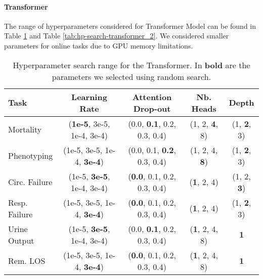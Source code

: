 \documentclass{article}
\begin{document}
\paragraph{Transformer} The range of hyperparameters considered for Transformer Model can be found in Table \ref{tab:hp-search-transformer} and Table \ref{tab:hp-search-transformer_2}. We considered smaller parameters for online tasks due to GPU memory limitations.
\begin{table}[tbh!]
    \centering
    \footnotesize
\begin{tabular}{l|c|c|c|c}

\toprule
Task & Learning Rate &  Attention Drop-out  & Nb. Heads & Depth  \\
\midrule
\midrule

Mortality & (\textbf{1e-5}, 3e-5, 1e-4, 3e-4) &  (0.0, \textbf{0.1}, 0.2, 0.3, 0.4) &    (1, 2, \textbf{4}, 8) &   (1, \textbf{2}, 3)  \\
Phenotyping & (1e-5, 3e-5, 1e-4, \textbf{3e-4}) &  (0.0, 0.1, \textbf{0.2}, 0.3, 0.4) &   (1, 2, 4, \textbf{8}) &  (1, \textbf{2}, 3) \\
\midrule
\midrule

Circ. Failure & (1e-5, \textbf{3e-5}, 1e-4, 3e-4) &  (\textbf{0.0}, 0.1, 0.2, 0.3, 0.4) & (\textbf{1}, 2, 4) & (1, 2, \textbf{3})  \\
Resp. Failure & (1e-5, 3e-5, 1e-4, \textbf{3e-4}) &  (\textbf{0.0}, 0.1, 0.2, 0.3, 0.4) & (\textbf{1}, 2, 4) & (1, \textbf{2}, 3)  \\

\midrule
\midrule

Urine Output & (1e-5, \textbf{3e-5}, 1e-4, 3e-4) &  (0.0, \textbf{0.1}, 0.2, 0.3, 0.4) &   (\textbf{1}, 2, 4, 8) & \textbf{1} \\
Rem. LOS & (1e-5, 3e-5, 1e-4, \textbf{3e-4}) &  (\textbf{0.0}, 0.1, 0.2, 0.3, 0.4) &    (\textbf{1}, 2, 4, 8)&\textbf{1} \\
\bottomrule
\end{tabular}
    \caption{Hyperparameter search range for the Transformer. In \textbf{bold} are the parameters we selected using random search. }
    \label{tab:hp-search-transformer}
\end{table}
\end{document}
